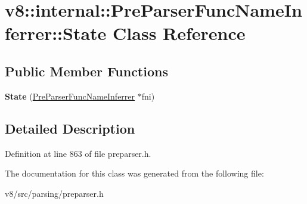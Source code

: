 \hypertarget{classv8_1_1internal_1_1PreParserFuncNameInferrer_1_1State}{}\section{v8\+:\+:internal\+:\+:Pre\+Parser\+Func\+Name\+Inferrer\+:\+:State Class Reference}
\label{classv8_1_1internal_1_1PreParserFuncNameInferrer_1_1State}
\subsection*{Public Member Functions}
\begin{DoxyCompactItemize}
\item 
\mbox{\label{classv8_1_1internal_1_1PreParserFuncNameInferrer_1_1State_af6c7b5c12bc1fdd234df251b954ec170}} 
{\bfseries State} (\mbox{\hyperlink{classv8_1_1internal_1_1PreParserFuncNameInferrer}{Pre\+Parser\+Func\+Name\+Inferrer}} $\ast$fni)
\end{DoxyCompactItemize}


\subsection{Detailed Description}


Definition at line 863 of file preparser.\+h.



The documentation for this class was generated from the following file\+:\begin{DoxyCompactItemize}
\item 
v8/src/parsing/preparser.\+h\end{DoxyCompactItemize}
